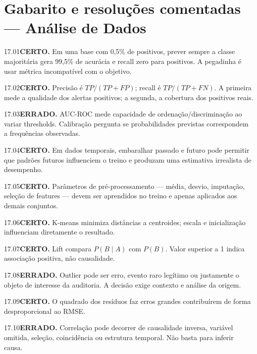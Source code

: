 \section{Gabarito e resoluções comentadas — Análise de Dados}

\begin{solucao}{17.01}\textbf{CERTO.} Em uma base com 0,5\% de positivos, prever sempre a classe majoritária gera 99,5\% de acurácia e recall zero para positivos. A pegadinha é usar métrica incompatível com o objetivo.\end{solucao}
\begin{solucao}{17.02}\textbf{CERTO.} Precisão é $TP/(TP+FP)$; recall é $TP/(TP+FN)$. A primeira mede a qualidade dos alertas positivos; a segunda, a cobertura dos positivos reais.\end{solucao}
\begin{solucao}{17.03}\textbf{ERRADO.} AUC-ROC mede capacidade de ordenação/discriminação ao variar thresholds. Calibração pergunta se probabilidades previstas correspondem a frequências observadas.\end{solucao}
\begin{solucao}{17.04}\textbf{CERTO.} Em dados temporais, embaralhar passado e futuro pode permitir que padrões futuros influenciem o treino e produzam uma estimativa irrealista de desempenho.\end{solucao}
\begin{solucao}{17.05}\textbf{CERTO.} Parâmetros de pré-processamento — média, desvio, imputação, seleção de features — devem ser aprendidos no treino e apenas aplicados aos demais conjuntos.\end{solucao}
\begin{solucao}{17.06}\textbf{CERTO.} K-means minimiza distâncias a centroides; escala e inicialização influenciam diretamente o resultado.\end{solucao}
\begin{solucao}{17.07}\textbf{CERTO.} Lift compara $P(B\mid A)$ com $P(B)$. Valor superior a 1 indica associação positiva, não causalidade.\end{solucao}
\begin{solucao}{17.08}\textbf{ERRADO.} Outlier pode ser erro, evento raro legítimo ou justamente o objeto de interesse da auditoria. A decisão exige contexto e análise da origem.\end{solucao}
\begin{solucao}{17.09}\textbf{CERTO.} O quadrado dos resíduos faz erros grandes contribuírem de forma desproporcional ao RMSE.\end{solucao}
\begin{solucao}{17.10}\textbf{ERRADO.} Correlação pode decorrer de causalidade inversa, variável omitida, seleção, coincidência ou estrutura temporal. Não basta para inferir causa.\end{solucao}

